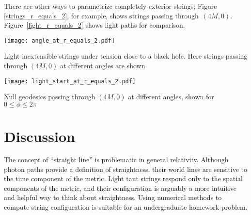 \documentclass{ws-tpe}
\begin{document}
There are other ways to parametrize completely exterior strings;
Figure \ref{strings_r_equals_2}, for example, shows strings passing
through~$(4M,0)$.  Figure~\ref{light_r_equals_2} shows light paths for
comparison.

\begin{figurehere}
  \centerline{
    \texttt{[image: angle\_at\_r\_equals\_2.pdf]} %
  }
  \caption{Light inextensible strings under tension close to a black
    hole.  Here strings passing through $(4M,0)$ at different angles are
    shown}
  \label{strings_r_equals_2}
\end{figurehere}

\begin{figurehere}
  \centerline{
    \texttt{[image: light\_start\_at\_r\_equals\_2.pdf]} %
  }
  \caption{Null geodesics passing through $(4M,0)$ at different angles,
    shown for $0\leqslant\phi\leqslant 2\pi$}
  \label{light_r_equals_2}
\end{figurehere}

\section{Discussion}

The concept of ``straight line'' is problematic in general relativity.
Although photon paths provide a definition of straightness, their
world lines are sensitive to the time component of the metric.  Light
taut strings respond only to the spatial components of the metric, and
their configuration is arguably a more intuitive and helpful way to
think about straightness.  Using numerical methods to compute string
configuration is suitable for an undergraduate homework problem.



\end{document}
